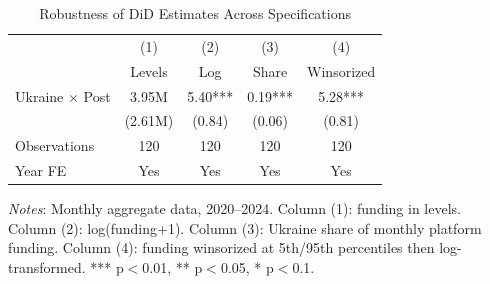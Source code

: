 \begin{table}[htbp]
\centering
\caption{Robustness of DiD Estimates Across Specifications}
\label{tab:robust_did}
\begin{threeparttable}
\begin{tabular}{lcccc}
\toprule
& (1) & (2) & (3) & (4) \\
& Levels & Log & Share & Winsorized \\
\midrule
Ukraine $\times$ Post & 3.95M & 5.40*** & 0.19*** & 5.28*** \\
& (2.61M) & (0.84) & (0.06) & (0.81) \\
\addlinespace
Observations & 120 & 120 & 120 & 120 \\
Year FE & Yes & Yes & Yes & Yes \\
\bottomrule
\end{tabular}
\begin{tablenotes}
\small
\item \textit{Notes}: Monthly aggregate data, 2020--2024. Column (1): funding in levels. Column (2): log(funding+1). Column (3): Ukraine share of monthly platform funding. Column (4): funding winsorized at 5th/95th percentiles then log-transformed. *** p$<$0.01, ** p$<$0.05, * p$<$0.1.
\end{tablenotes}
\end{threeparttable}
\end{table}

